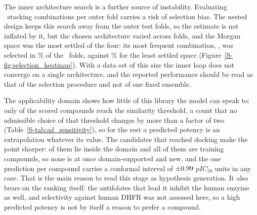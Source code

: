 The inner architecture search is a further source of instability. Evaluating \NArchitectureCombos\ stacking combinations per outer fold carries a risk of selection bias. The nested design keeps this search away from the outer test folds, so the estimate is not inflated by it, but the chosen architecture varied across folds, and the Morgan space was the most settled of the four: its most frequent combination, \MorganBestArchitecture, was selected in \MorganStability\% of the \TotalOuterFolds\ folds, against \RdkitTwoDFpStability\% for the least settled space (Figure~\ref{S-fig:selection_heatmap}). With a data set of this size the inner loop does not converge on a single architecture, and the reported performance should be read as that of the selection procedure and not of one fixed ensemble.

The applicability domain shows how little of this library the model can speak to: only \ScreenNDomain{} of the \ScreenNStructural{} scored compounds reach the similarity threshold, a count that no admissible choice of that threshold changes by more than a factor of two (Table~\ref{S-tab:ad_sensitivity}), so for the rest a predicted potency is an extrapolation whatever its value. The candidates that reached docking make the point sharper: \ScreenNCandidatesInDomain{} of them lie inside the domain and all of them are training compounds, so none is at once domain-supported and new, and the one prediction per compound carries a conformal interval of $\pm0.99$ $pIC_{50}$ units in any case. That is the main reason to read this stage as hypothesis generation. It also bears on the ranking itself: the antifolates that lead it inhibit the human enzyme as well, and selectivity against human DHFR was not assessed here, so a high predicted potency is not by itself a reason to prefer a compound.

